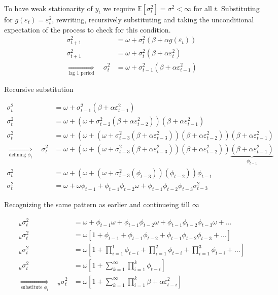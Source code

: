 \documentclass{EconHomework}
\begin{document}
To have weak stationarity of $y_{t}$ we require $\mathbb{E}\left[\sigma_{t}^{2}\right]=\sigma^{2}<\infty$
for all $t$. Substituting for $g\left(\varepsilon_{t}\right)=\varepsilon_{t}^{2}$,
rewriting, recursively substituting and taking the unconditional expectation
of the process to check for this condition.
\begin{align*}
\sigma_{t+1}^{2} & =\omega+\sigma_{t}^{2}\left(\beta+\alpha g\left(\varepsilon_{t}\right)\right)\\
\sigma_{t+1}^{2} & =\omega+\sigma_{t}^{2}\left(\beta+\alpha\varepsilon_{t}^{2}\right)\\
\underset{\text{lag 1 period}}{\Longrightarrow}\quad\sigma_{t}^{2} & =\omega+\sigma_{t-1}^{2}\left(\beta+\alpha\varepsilon_{t-1}^{2}\right)
\end{align*}

Recursive substitution

\begin{align*}
\sigma_{t}^{2} & =\omega+\sigma_{t-1}^{2}\left(\beta+\alpha\varepsilon_{t-1}^{2}\right)\\
\sigma_{t}^{2} & =\omega+\left(\omega+\sigma_{t-2}^{2}\left(\beta+\alpha\varepsilon_{t-2}^{2}\right)\right)\left(\beta+\alpha\varepsilon_{t-1}^{2}\right)\\
\sigma_{t}^{2} & =\omega+\left(\omega+\left(\omega+\sigma_{t-3}^{2}\left(\beta+\alpha\varepsilon_{t-3}^{2}\right)\right)\left(\beta+\alpha\varepsilon_{t-2}^{2}\right)\right)\left(\beta+\alpha\varepsilon_{t-1}^{2}\right)\\
\underset{\text{defining }\phi_{t}}{\Longrightarrow}\quad\sigma_{t}^{2} & =\omega+\left(\omega+\left(\omega+\sigma_{t-3}^{2}\left(\beta+\alpha\varepsilon_{t-3}^{2}\right)\right)\left(\beta+\alpha\varepsilon_{t-2}^{2}\right)\right)\underbrace{\left(\beta+\alpha\varepsilon_{t-1}^{2}\right)}_{\phi_{t-1}}\\
\sigma_{t}^{2} & =\omega+\left(\omega+\left(\omega+\sigma_{t-3}^{2}\left(\phi_{t-3}\right)\right)\left(\phi_{t-2}\right)\right)\phi_{t-1}\\
\sigma_{t}^{2} & =\omega+\omega\phi_{t-1}+\phi_{t-1}\phi_{t-2}\omega+\phi_{t-1}\phi_{t-2}\phi_{t-3}\sigma_{t-3}^{2}
\end{align*}

Recognizing the same pattern as earlier and continueing till $\infty$

\begin{align*}
    _{u}\sigma_{t}^{2}&=\omega+\phi_{t-1}\omega+\phi_{t-1}\phi_{t-2}\omega+\phi_{t-1}\phi_{t-2}\phi_{t-3}\omega+\dots\\
    _{u}\sigma_{t}^{2}&=\omega\left[1+\phi_{t-1}+\phi_{t-1}\phi_{t-2}+\phi_{t-1}\phi_{t-2}\phi_{t-3}+\dots\right]\\
    _{u}\sigma_{t}^{2}&=\omega\left[1+\prod_{i=1}^{1}\phi_{t-i}+\prod_{i=1}^{2}\phi_{t-i}+\prod_{i=1}^{3}\phi_{t-i}+\dots\right]\\
    _{u}\sigma_{t}^{2}&=\omega\left[1+\sum_{k=1}^{\infty}\prod_{i=1}^{k}\phi_{t-i}\right]\\
    \underset{\text{substitute }\phi_{t}}{\Longrightarrow}\quad{}_{u}\sigma_{t}^{2}&=\omega\left[1+\sum_{k=1}^{\infty}\prod_{i=1}^{k}\beta+\alpha\varepsilon_{t-i}^{2}\right]
\end{align*}
\end{document}
